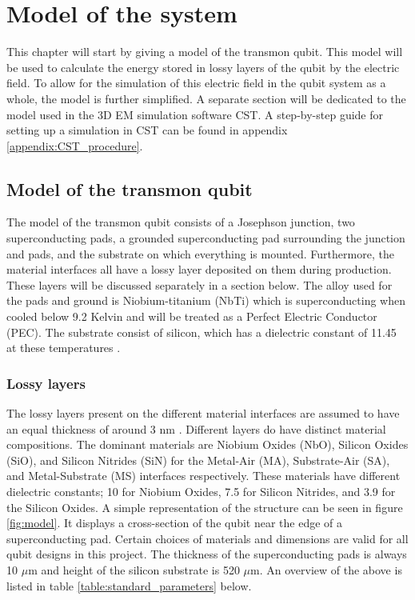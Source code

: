 \chapter{Model of the system}
This chapter will start by giving a model of the transmon qubit. This model will be used to calculate the energy stored in lossy layers of the qubit by the electric field. To allow for the simulation of this electric field in the qubit system as a whole, the model is further simplified. A separate section will be dedicated to the model used in the 3D EM simulation software CST. A step-by-step guide for setting up a simulation in CST can be found in appendix \ref{appendix:CST_procedure}.
 
\section{Model of the transmon qubit}
The model of the transmon qubit consists of a Josephson junction, two superconducting pads, a grounded superconducting pad surrounding the junction and pads, and the substrate on which everything is mounted. Furthermore, the material interfaces all have a lossy layer deposited on them during production. These layers will be discussed separately in a section below. The alloy used for the pads and ground is Niobium-titanium (NbTi) which is superconducting when cooled below 9.2 Kelvin \cite{LandoltBornstein1994} and will be treated as a Perfect Electric Conductor (PEC). The substrate consist of silicon, which has a dielectric constant of 11.45 at these temperatures . 

\subsection{Lossy layers}
The lossy layers present on the different material interfaces are assumed to have an equal thickness of around 3 nm \cite{Wenner2011}. Different layers do have distinct material compositions. The dominant materials are Niobium Oxides (NbO), Silicon Oxides (SiO), and Silicon Nitrides (SiN) for the Metal-Air (MA), Substrate-Air (SA), and Metal-Substrate (MS) interfaces respectively. These materials have different dielectric constants; 10 for Niobium Oxides, 7.5 for Silicon Nitrides, and 3.9 for the Silicon Oxides. A simple representation of the structure can be seen in figure \ref{fig:model}. It displays a cross-section of the qubit near the edge of a superconducting pad. Certain choices of materials and dimensions are valid for all qubit designs in this project. The thickness of the superconducting pads is always 10 \(\mu\)m and height of the silicon substrate is 520 \(\mu\)m. An overview of the above is listed in table \ref{table:standard_parameters} below.

